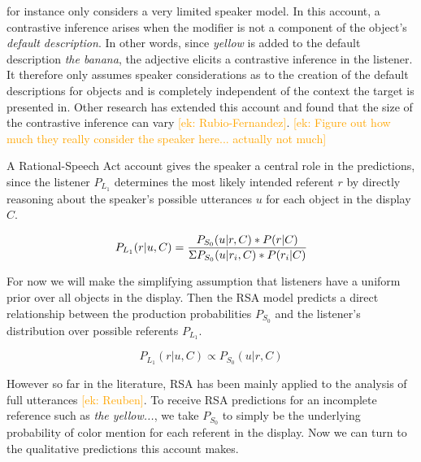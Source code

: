 \documentclass[10pt,letterpaper]{article}
\newcommand{\ek}[1]{\textcolor{Orange}{[ek: #1]}}
\begin{document}
 for instance only considers a very limited speaker model. In this account, a contrastive inference arises when the modifier is not a component of the object's \textit{default description}. In other words, since \textit{yellow} is added to the default description \textit{the banana}, the adjective elicits a contrastive inference in the listener. It therefore only assumes speaker considerations as to the creation of the default descriptions for objects and is completely independent of the context the target is presented in. 
Other research has extended this account and found that the size of the contrastive inference can vary \cite{Aparicio:2018}\ek{Rubio-Fernandez}. \ek{Figure out how much they really consider the speaker here... actually not much}


A Rational-Speech Act account gives the speaker a central role in the predictions, since the listener $P_{L_1}$ determines the most likely intended referent $r$ by directly reasoning about the speaker's possible utterances $u$ for each object in the display $C$. 

\begin{equation}
	P_{L_1}(r|u,C) = \frac{P_{S_0}(u|r,C) * P(r|C)}{\Sigma \space P_{S_0}(u|r_{i},C) * P(r_{i}|C)}
\label{eq-prior}
\end{equation}

For now we will make the simplifying assumption that listeners have a uniform prior over all objects in the display. Then the RSA model predicts a direct relationship between the production probabilities $P_{S_0}$ and the listener's distribution over possible referents $P_{L_1}$. 

\begin{equation}
	P_{L_1}(r|u,C) \propto P_{S_0}(u|r,C)
\label{eq-prior}
\end{equation}

However so far in the literature, RSA has been mainly applied to the analysis of full utterances \ek{Reuben}. To receive RSA predictions for an incomplete reference such as \textit{the yellow...}, we take $P_{S_0}$ to simply be the underlying probability of color mention for each referent in the display. Now we can turn to the qualitative predictions this account makes.
\end{document}
